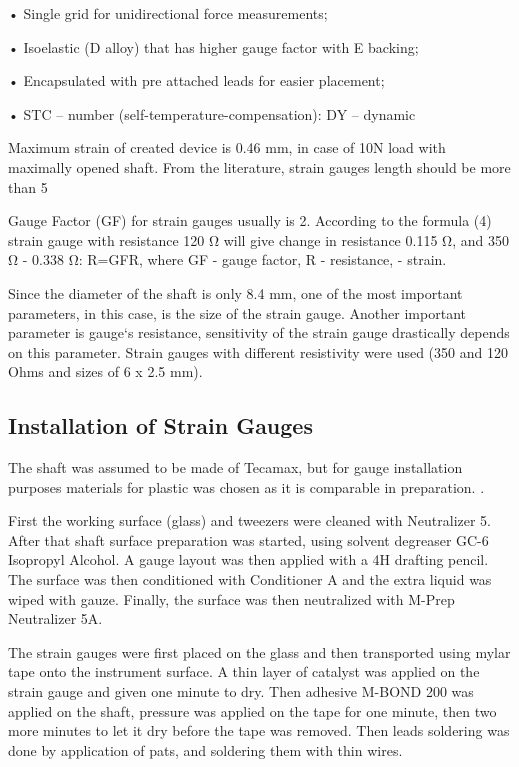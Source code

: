 	• Single grid for unidirectional force measurements;
	
	• Isoelastic (D alloy) that has higher gauge factor with E backing;
	
	• Encapsulated with pre attached leads for easier placement;
	
	• STC – number (self-temperature-compensation): DY – dynamic
	
Maximum strain of created device is  0.46 mm, in case of 10N load with maximally opened shaft. From the literature, strain gauges length should be more than 5%

Gauge Factor (GF) for strain gauges usually is 2. According to the formula (4) strain gauge with resistance 120 Ω will give change in resistance 0.115 Ω, and 350 Ω - 0.338 Ω:
R=GFR,
where GF - gauge factor, R - resistance, - strain.

	Since the diameter of the shaft is only 8.4 mm, one of the most important parameters, in this case, is the size of the strain gauge. Another important parameter is gauge‘s resistance, sensitivity of the strain gauge drastically depends on this parameter. Strain gauges with different resistivity were used (350 and 120 Ohms and sizes of 6 x 2.5 mm).

	\subsection{Installation of Strain Gauges}
	\label{sec:instSG}

	The shaft was assumed to be made of Tecamax, but for gauge installation purposes materials for plastic was chosen as it is comparable in preparation. \cite{StrGugeInst}.

	First the working surface (glass) and tweezers were cleaned with Neutralizer 5. After that shaft surface preparation was started, using solvent degreaser GC-6 Isopropyl Alcohol. A gauge layout was then applied with a 4H drafting pencil. The surface was then conditioned with Conditioner A and the extra liquid was wiped with gauze. Finally, the surface was then neutralized with M-Prep Neutralizer 5A. \cite{StrGugeInst}

	The strain gauges were first placed on the glass and then transported using mylar tape onto the instrument surface. A thin layer of catalyst was applied on the strain gauge and given one minute to dry. Then adhesive M-BOND 200 was applied on the shaft, pressure was applied on the tape for one minute, then two more minutes to let it dry before the tape was removed. Then leads soldering was done by application of pats, and soldering them with thin wires. \cite{youtube}

